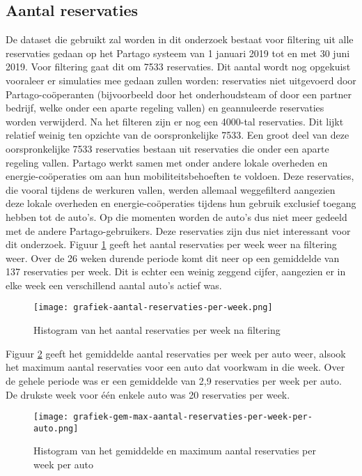 \subsection{Aantal reservaties}
De dataset die gebruikt zal worden in dit onderzoek bestaat voor filtering uit alle reservaties gedaan op het Partago systeem van 1 januari 2019 tot en met 30 juni 2019. Voor filtering gaat dit om 7533 reservaties. Dit aantal wordt nog opgekuist vooraleer er simulaties mee gedaan zullen worden: reservaties niet uitgevoerd door Partago-coöperanten (bijvoorbeeld door het onderhoudsteam of door een partner bedrijf, welke onder een aparte regeling vallen) en geannuleerde reservaties worden verwijderd. Na het filteren zijn er nog een 4000-tal reservaties. Dit lijkt relatief weinig ten opzichte van de oorspronkelijke 7533. Een groot deel van deze oorspronkelijke 7533 reservaties bestaan uit reservaties die onder een aparte regeling vallen. Partago werkt samen met onder andere lokale overheden en energie-coöperaties om aan hun mobiliteitsbehoeften te voldoen. Deze reservaties, die vooral tijdens de werkuren vallen, werden allemaal weggefilterd aangezien deze lokale overheden en energie-coöperaties tijdens hun gebruik exclusief toegang hebben tot de auto's. Op die momenten worden de auto's dus niet meer gedeeld met de andere Partago-gebruikers. Deze reservaties zijn dus niet interessant voor dit onderzoek.
Figuur \ref{grafiek:aantal-reservaties-per-week} geeft het aantal reservaties per week weer na filtering weer. Over de 26 weken durende periode komt dit neer op een gemiddelde van 137 reservaties per week. Dit is echter een weinig zeggend cijfer, aangezien er in elke week een verschillend aantal auto's actief was. 
\begin{figure}[p]
	\texttt{[image: grafiek-aantal-reservaties-per-week.png]}
	\caption[Histogram van het aantal reservaties per week na filtering]{Histogram van het aantal reservaties per week na filtering}
	\label{grafiek:aantal-reservaties-per-week}
\end{figure}
Figuur \ref{grafiek:aantal-reservaties-per-week-per-auto} geeft het gemiddelde aantal reservaties per week per auto weer, alsook het maximum aantal reservaties voor een auto dat voorkwam in die week. Over de gehele periode was er een gemiddelde van 2,9 reservaties per week per auto. De drukste week voor één enkele auto was 20 reservaties per week. 
\begin{figure}[p]
	\texttt{[image: grafiek-gem-max-aantal-reservaties-per-week-per-auto.png]}
	\caption[Histogram van het gemiddelde en maximum aantal reservaties per week per auto]{Histogram van het gemiddelde en maximum aantal reservaties per week per auto}
	\label{grafiek:aantal-reservaties-per-week-per-auto}
\end{figure}

